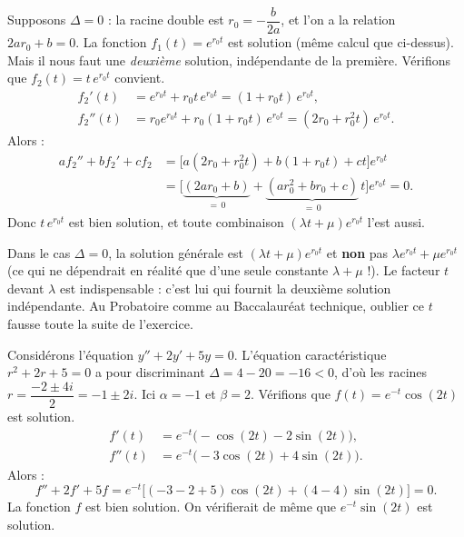 \documentclass[11pt]{article}
\begin{document}
\begin{experience}[Justification guidée : le cas $\Delta = 0$]
Supposons $\Delta = 0$ : la racine double est $r_0 = -\dfrac{b}{2a}$, et l'on a la relation $2a r_0 + b = 0$. La fonction $f_1(t) = e^{r_0 t}$ est solution (même calcul que ci-dessus). Mais il nous faut une \emph{deuxième} solution, indépendante de la première. Vérifions que $f_2(t) = t\, e^{r_0 t}$ convient.
\begin{align*}
f_2'(t) &= e^{r_0 t} + r_0 t\, e^{r_0 t} = (1 + r_0 t)\, e^{r_0 t}, \\
f_2''(t) &= r_0 e^{r_0 t} + r_0(1 + r_0 t)\, e^{r_0 t} = (2 r_0 + r_0^2 t)\, e^{r_0 t}.
\end{align*}
Alors :
\begin{align*}
a f_2'' + b f_2' + c f_2 &= \big[a(2 r_0 + r_0^2 t) + b(1 + r_0 t) + c t\big] e^{r_0 t} \\
&= \big[\underbrace{(2 a r_0 + b)}_{=\,0} + \underbrace{(a r_0^2 + b r_0 + c)}_{=\,0}\, t\big] e^{r_0 t} = 0.
\end{align*}
Donc $t\,e^{r_0 t}$ est bien solution, et toute combinaison $(\lambda t + \mu)e^{r_0 t}$ l'est aussi.
\end{experience}

\begin{attention}
Dans le cas $\Delta = 0$, la solution générale est $(\lambda t + \mu)e^{r_0 t}$ et \textbf{non} pas $\lambda e^{r_0 t} + \mu e^{r_0 t}$ (ce qui ne dépendrait en réalité que d'une seule constante $\lambda + \mu$ !). Le facteur $t$ devant $\lambda$ est indispensable : c'est lui qui fournit la deuxième solution indépendante. Au Probatoire comme au Baccalauréat technique, oublier ce $t$ fausse toute la suite de l'exercice.
\end{attention}

\begin{exemplebox}
Considérons l'équation $y'' + 2y' + 5y = 0$. L'équation caractéristique $r^2 + 2r + 5 = 0$ a pour discriminant $\Delta = 4 - 20 = -16 < 0$, d'où les racines $r = \dfrac{-2 \pm 4i}{2} = -1 \pm 2i$. Ici $\alpha = -1$ et $\beta = 2$. Vérifions que $f(t) = e^{-t}\cos(2t)$ est solution.
\begin{align*}
f'(t) &= e^{-t}\big(-\cos(2t) - 2\sin(2t)\big), \\
f''(t) &= e^{-t}\big(-3\cos(2t) + 4\sin(2t)\big).
\end{align*}
Alors :
\[ f'' + 2f' + 5f = e^{-t}\big[(-3 - 2 + 5)\cos(2t) + (4 - 4)\sin(2t)\big] = 0. \]
La fonction $f$ est bien solution. On vérifierait de même que $e^{-t}\sin(2t)$ est solution.
\end{exemplebox}
\end{document}
